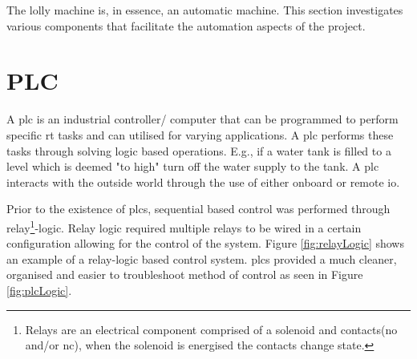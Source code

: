 
The lolly machine is, in essence, an automatic machine. This section investigates various components that facilitate the automation aspects of the project.

\section{PLC}


    A \acrfull{plc} is an industrial controller/ computer that can be programmed to perform specific \acrshort{rt} tasks and can utilised for varying applications\cite{petruzella2017programmable}. A \acrshort{plc} performs these tasks through solving logic based operations\cite{petruzella2017programmable}.  E.g., if a water tank is filled to a level which is deemed "to high" turn off the water supply to the tank. A \acrshort{plc} interacts with the outside world through the use of either onboard or remote \acrshort{io}.
    
    Prior to the existence of \acrshort{plc}s, sequential based control was performed through relay\footnote{Relays are an electrical component comprised of a solenoid and contacts(\acrshort{no} and/or \acrshort{nc}), when the solenoid is energised the contacts change state.}-logic. Relay logic required multiple relays to be wired in a certain configuration allowing for the control of the system. Figure \ref{fig:relayLogic} shows an example of a relay-logic based control system\cite{petruzella2017programmable}. 
    \acrshort{plc}s provided a much cleaner, organised and easier to troubleshoot method of control as seen in Figure \ref{fig:plcLogic}.    
    
